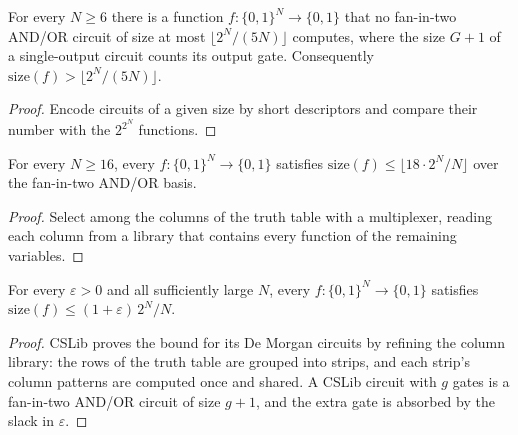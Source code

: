 \begin{theorem}
  \label{thm:lowerbounds-shannon-lower}
  \leanok
  For every $N \ge 6$ there is a function $f : \{0,1\}^N \to \{0,1\}$ that no
  fan-in-two AND/OR circuit of size at most $\lfloor 2^N / (5N) \rfloor$
  computes, where the size $G + 1$ of a single-output circuit counts its output
  gate. Consequently $\mathrm{size}(f) > \lfloor 2^N / (5N) \rfloor$.
\end{theorem}
\begin{proof}
  \leanok
  Encode circuits of a given size by short descriptors and compare their
  number with the $2^{2^N}$ functions.
\end{proof}

\begin{theorem}
  \label{thm:lowerbounds-shannon-upper}
  \leanok
  For every $N \ge 16$, every $f : \{0,1\}^N \to \{0,1\}$ satisfies
  $\mathrm{size}(f) \le \lfloor 18 \cdot 2^N / N \rfloor$ over the fan-in-two
  AND/OR basis.
\end{theorem}
\begin{proof}
  \leanok
  Select among the columns of the truth table with a multiplexer, reading each
  column from a library that contains every function of the remaining
  variables.
\end{proof}

\begin{theorem}[Lupanov]
  \label{thm:lowerbounds-lupanov}
  \leanok
  For every $\varepsilon > 0$ and all sufficiently large $N$, every
  $f : \{0,1\}^N \to \{0,1\}$ satisfies
  $\mathrm{size}(f) \le (1 + \varepsilon)\, 2^N / N$.
\end{theorem}
\begin{proof}
  \leanok
  CSLib proves the bound for its De Morgan circuits by refining the column
  library: the rows of the truth table are grouped into strips, and each
  strip's column patterns are computed once and shared. A CSLib circuit with
  $g$ gates is a fan-in-two AND/OR circuit of size $g + 1$, and the extra gate
  is absorbed by the slack in $\varepsilon$.
\end{proof}

